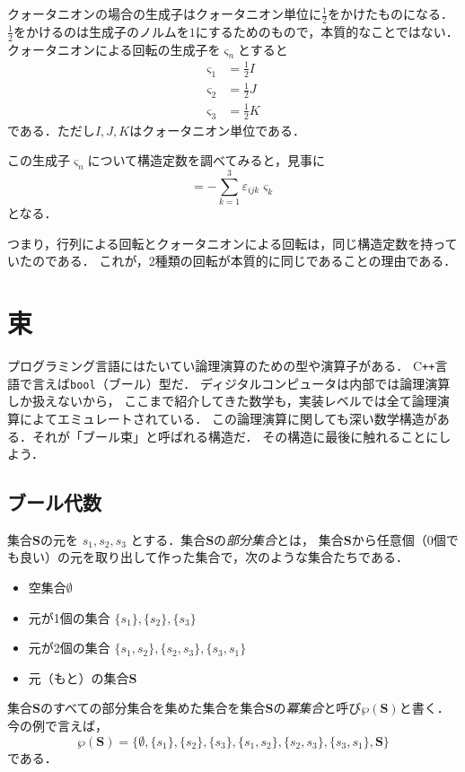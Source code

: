 \documentclass{jsbook}
\newcommand{\cxx}{\textrm{C}\texttt{++}}
\newcommand{\ccode}[1]{\texttt{#1}}
\newcommand{\keyword}[1]{\emph{#1}}
\newcommand{\bg}[1]{\mathbf{#1}}
\begin{document}
クォータニオンの場合の生成子はクォータニオン単位に$\frac{1}{2}$をかけたものになる．
$\frac{1}{2}$をかけるのは生成子のノルムを$1$にするためのもので，本質的なことではない．
クォータニオンによる回転の生成子を$\varsigma_n$とすると
\begin{align}
\varsigma_1&=\frac{1}{2}I\\
\varsigma_2&=\frac{1}{2}J\\
\varsigma_3&=\frac{1}{2}K
\end{align}
である．ただし$I,J,K$はクォータニオン単位である．

この生成子$\varsigma_n$について構造定数を調べてみると，見事に
\begin{equation}
[\varsigma_i,\varsigma_j]=-\sum_{k=1}^3\varepsilon_{ijk}\varsigma_k
\end{equation}
となる．

つまり，行列による回転とクォータニオンによる回転は，同じ構造定数を持っていたのである．
これが，2種類の回転が本質的に同じであることの理由である．


\chapter{束}

プログラミング言語にはたいてい論理演算のための型や演算子がある．
\cxx 言語で言えば\ccode{bool}（ブール）型だ．
ディジタルコンピュータは内部では論理演算しか扱えないから，
ここまで紹介してきた数学も，実装レベルでは全て論理演算によてエミュレートされている．
この論理演算に関しても深い数学構造がある．それが「ブール束」と呼ばれる構造だ．
その構造に最後に触れることにしよう．

\section{ブール代数}

集合$\bg{S}$の元を $s_1,s_2,s_3$ とする．集合$\bg{S}$の\keyword{部分集合}とは，
集合$\bg{S}$から任意個（0個でも良い）の元を取り出して作った集合で，次のような集合たちである．
\begin{itemize}
\item 空集合$\emptyset$
\item 元が1個の集合 $\{s_1\},\{s_2\},\{s_3\}$
\item 元が2個の集合 $\{s_1,s_2\},\{s_2,s_3\},\{s_3,s_1\}$
\item 元（もと）の集合$\bg{S}$
\end{itemize}
集合$\bg{S}$のすべての部分集合を集めた集合を集合$\bg{S}$の\keyword{冪集合}と呼び$\wp(\bg{S})$と書く．
今の例で言えば，
\begin{equation}
\wp(\bg{S})=\{\emptyset,\{s_1\},\{s_2\},\{s_3\},\{s_1,s_2\},\{s_2,s_3\},\{s_3,s_1\},\bg{S}\}
\end{equation}
である．
\end{document}
